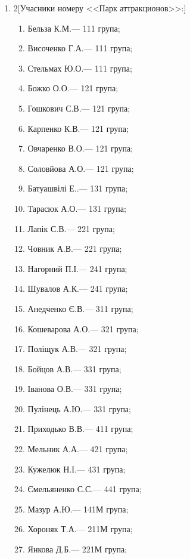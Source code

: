 \documentclass[
	a4paper,
	12pt,
	oneside,
	draft
]{extreport}
\begin{document}
\begin{enumerate}[topsep=0pt,itemsep=-1ex,partopsep=1ex,parsep=1ex]
\item 
\begin{multicols}{2}[Учасники номеру <<Парк аттракционов>>:] 
\begin{enumerate}[topsep=0pt,itemsep=-1ex,partopsep=1ex,parsep=1ex,label=\arabic*.]
\item Бельза К.М.\hfill --- 111 група;
\item Височенко Г.А.\hfill --- 111 група;
\item Стельмах Ю.О.\hfill --- 111 група;
\item Божко О.О.\hfill --- 121 група;
\item Гошкович С.В.\hfill --- 121 група;
\item Карпенко К.В.\hfill --- 121 група;
\item Овчаренко В.О.\hfill --- 121 група;
\item Соловйова А.О.\hfill --- 121 група;
\item Батуашвілі Е..\hfill --- 131 група;
\item Тарасюк А.О.\hfill --- 131 група;
\item Лапік С.В.\hfill --- 221 група;
\item Човник А.В.\hfill --- 221 група;
\item Нагорний П.І.\hfill --- 241 група;
\item Шувалов А.К.\hfill --- 241 група;
\item Анедченко Є.В.\hfill --- 311 група;
\item Кошеварова А.О.\hfill --- 321 група;
\item Поліщук А.В.\hfill --- 321 група;
\item Бойцов А.В.\hfill --- 331 група;
\item Іванова О.В.\hfill --- 331 група;
\item Пулінець А.Ю.\hfill --- 331 група;
\item Приходько В.В.\hfill --- 411 група;
\item Мельник А.А.\hfill --- 421 група;
\item Кужелюк Н.І.\hfill --- 431 група;
\item Ємельяненко С.С.\hfill --- 441 група;
\item Мазур А.Ю.\hfill --- 141М група;
\item Хороняк Т.А.\hfill --- 211М група;
\item Янкова Д.Б.\hfill --- 221М група;
\end{enumerate}
\end{multicols}


\end{enumerate}
\end{document}
